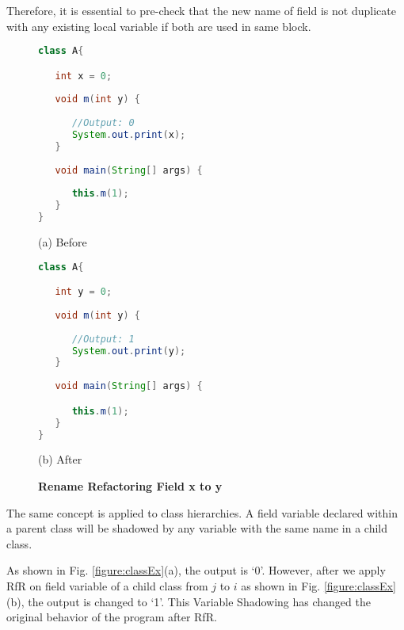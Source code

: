 Therefore, it is essential to pre-check that the new name of field is not duplicate with any existing local variable if both are used in same block.
 

\begin{figure}[th]
\centering
\begin{minipage}[t]{0.47\linewidth}
\begin{lstlisting}[language=java, basicstyle=\scriptsize\ttfamily,frame=single]
class A{

   int x = 0;
	
   void m(int y) {
	
      //Output: 0
      System.out.print(x);
   }
	
   void main(String[] args) {
	
      this.m(1);
   }
}

\end{lstlisting}
\centering(a) Before
\end{minipage}
\hfill
\begin{minipage}[t]{0.47\linewidth}
\begin{lstlisting}[language=java, basicstyle=\scriptsize\ttfamily,frame=single]
class A{

   int y = 0;
	
   void m(int y) {
	
      //Output: 1
      System.out.print(y);
   }
	
   void main(String[] args) {

      this.m(1);
   }
}
\end{lstlisting}
\centering(b) After
\end{minipage}
\caption{\textbf{Rename Refactoring Field x to y}}
\label{figure:sameBlock}
\end{figure}

The same concept is applied to class hierarchies. A field variable declared within a parent class will be shadowed by any variable with the same name in a child class. 

As shown in Fig. \ref{figure:classEx}(a), the output is `0'. However, after we apply RfR on field variable of a child class from $j$ to $i$ as shown in Fig. \ref{figure:classEx}(b), the output is changed to `1'. This Variable Shadowing has changed the original behavior of the program after RfR. 

